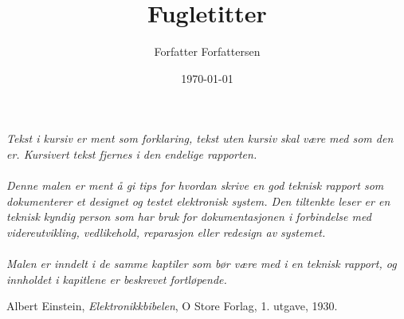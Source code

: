 \documentclass[11pt,norsk]{elsys-teknisk}
\title{Fugletitter}
\author{Forfatter Forfattersen}
\date{\today}
\begin{document}
\maketitle

\toc

\textit{Tekst i kursiv er ment som forklaring, tekst uten kursiv skal være med som den er. Kursivert tekst fjernes i den endelige rapporten.\\
\\
Denne malen er ment å gi tips for hvordan skrive en god teknisk rapport som dokumenterer et designet og testet elektronisk system. Den tiltenkte leser er en teknisk kyndig person som har bruk for dokumentasjonen i forbindelse med videreutvikling, vedlikehold, reparasjon eller redesign av systemet.\\
\\
Malen er inndelt i de samme kaptiler som bør være med i en teknisk rapport, og innholdet i kapitlene er beskrevet fortløpende.
}

\jolyu

\newpage



\newpage



\newpage



\newpage



\newpage



\newpage




{}
\begin{thebibliography}{99}

  Albert Einstein,
  \emph{Elektronikkbibelen},
  O Store Forlag,
  1. utgave,
  1930.

\end{thebibliography}


\appendix

\end{document}
